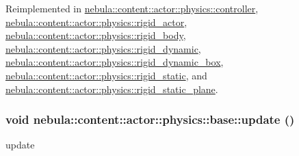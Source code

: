 Reimplemented in \hyperlink{classnebula_1_1content_1_1actor_1_1physics_1_1controller_a76e049f3e302ed369ed9d2820487cc3e}{nebula::content::actor::physics::controller}, \hyperlink{classnebula_1_1content_1_1actor_1_1physics_1_1rigid__actor_a8d53c36044b639537cecff87ef9f84f1}{nebula::content::actor::physics::rigid\_\-actor}, \hyperlink{classnebula_1_1content_1_1actor_1_1physics_1_1rigid__body_a480452963a16809aef9a8bd80bce1d16}{nebula::content::actor::physics::rigid\_\-body}, \hyperlink{classnebula_1_1content_1_1actor_1_1physics_1_1rigid__dynamic_a23e957b179440185cfc15750b47f3a5c}{nebula::content::actor::physics::rigid\_\-dynamic}, \hyperlink{classnebula_1_1content_1_1actor_1_1physics_1_1rigid__dynamic__box_a849dd1aec8bf8be223dc3d7d9c1f81b5}{nebula::content::actor::physics::rigid\_\-dynamic\_\-box}, \hyperlink{classnebula_1_1content_1_1actor_1_1physics_1_1rigid__static_a83be7bda449d94b5d7a69c8b8f99f6de}{nebula::content::actor::physics::rigid\_\-static}, and \hyperlink{classnebula_1_1content_1_1actor_1_1physics_1_1rigid__static__plane_aeb2d9144ad76f92c6170bbc5ad81c2d6}{nebula::content::actor::physics::rigid\_\-static\_\-plane}.\hypertarget{classnebula_1_1content_1_1actor_1_1physics_1_1base_a468da70c6f6c2520b458662ab97b76e5}{
\subsubsection[{update}]{\setlength{\rightskip}{0pt plus 5cm}void nebula::content::actor::physics::base::update ()}}
\label{classnebula_1_1content_1_1actor_1_1physics_1_1base_a468da70c6f6c2520b458662ab97b76e5}


update 

